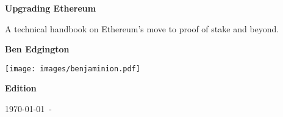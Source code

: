 \begin{titlepage}

   \begin{center}

     \vspace*{1.0cm}

     \Huge

     \textbf{Upgrading Ethereum}

     \vfill

     \Large

     A technical handbook on Ethereum's move to proof of stake and beyond.

     \vfill

     \textbf{Ben Edgington}

     \vfill

     \texttt{[image: images/benjaminion.pdf]}

     \vfill

     \textbf{ Edition}

     \vfill

     \normalsize

     \today\ - \href{https://github.com/benjaminion/upgrading-ethereum-book}{\texttt{}}

   \end{center}
   \restoregeometry
\end{titlepage}
